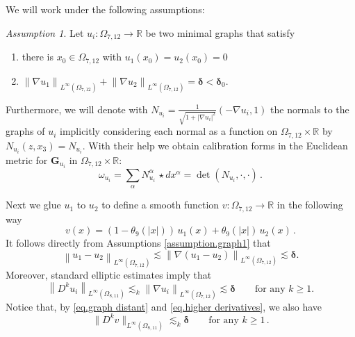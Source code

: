 \documentclass[reqno]{amsart}
\theoremstyle{definition}
\theoremstyle{remark}
\newtheorem{assumption}[definition]{Assumption}
\numberwithin{equation}{section}
\newcommand{\norm}[1]{\left\lVert#1\right\rVert}
\newcommand{\R}{\mathbb{R}}
\newcommand{\bG}{\mathbf{G}} %
\begin{document}
We will work under the following assumptions:

\begin{assumption}\label{ass:glue}
Let $u_i\colon \Omega_{7,12}\to \R$ be two minimal graphs that satisfy
\begin{enumerate}[label=(A.\arabic*)]
    \item\label{assumption.graph1} there is $x_0 \in \Omega_{7,12}$ with $u_1(x_0)=u_2(x_0)=0$
    \item\label{assumption.graph2} $\norm{\nabla u_1}_{L^\infty(\Omega_{7,12})}+\norm{\nabla u_2}_{L^\infty(\Omega_{7,12})} = \boldsymbol{\delta}<\boldsymbol{\delta}_0$.
\end{enumerate}
\end{assumption}


Furthermore, we will denote with $N_{u_i}= \frac{1}{\sqrt{1+|\nabla u_i|^2}} (-\nabla u_i, 1)$ the normals to the graphs of $u_i$ implicitly considering each normal as a function on $\Omega_{7,12}\times \R$ by $N_{u_i}(z,x_3)=N_{u_i}$. With their help we obtain calibration forms in the Euclidean metric for $\bG_{u_i}$ in $\Omega_{7,12}\times \R$: 
\begin{equation}\label{eq.callibration forms for the graphs}
    \omega_{u_i}= \sum_{\alpha} N^\alpha_{u_i}\, \star dx^\alpha = \det(N_{u_i}, \cdot, \cdot) \,.
\end{equation}

Next we glue $u_1$ to $u_2$ to define a smooth function $v\colon \Omega_{7,12}\to \R$ in the following way
\begin{equation}\label{eq.gluefunct}
v(x)=(1-\theta_9(|x|))\, u_1(x)+\theta_9(|x|)\, u_2(x)\,.
\end{equation}
It follows directly from Assumptions \ref{assumption.graph1} that
\begin{equation}\label{eq.graph distant}
    \norm{u_1-u_2}_{L^\infty(\Omega_{7,12})} \lesssim \norm{\nabla (u_1-u_2)}_{L^\infty(\Omega_{7,12})} \lesssim \boldsymbol{\delta}.
\end{equation}
Moreover, standard elliptic estimates imply that  
\begin{equation}\label{eq.higher derivatives}
    \norm{D^k u_i}_{L^\infty(\Omega_{8,11})} \lesssim_k \norm{\nabla u_i}_{L^\infty(\Omega_{7,12})} \lesssim \boldsymbol{\delta} \qquad \text{for any $k\ge 1$}.
\end{equation}
Notice that, by \eqref{eq.graph distant} and \eqref{eq.higher derivatives}, we also have 
\begin{equation}\label{eq:vestimate1}
    \|D^k v\|_{L^\infty(\Omega_{8,11})}\lesssim_k \boldsymbol{\delta}\qquad \text{for any $k\ge 1$}\,.
\end{equation}
\end{document}
